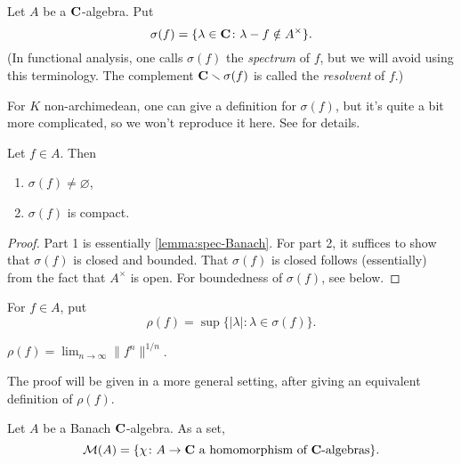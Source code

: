 \begin{definition}
Let $A$ be a $\mathbf{C}$-algebra. Put 
\[
  \sigma(f) = \{\lambda\in \mathbf{C}\colon \lambda-f\notin A^\times\} .
\]
(In functional analysis, one calls $\sigma(f)$ the \emph{spectrum} of $f$, but 
we will avoid using this terminology. The complement 
$\mathbf{C}\smallsetminus \sigma(f)$ is called the \emph{resolvent} of $f$.)
\end{definition}

For $K$ non-archimedean, one can give a definition for $\sigma(f)$, but it's 
quite a bit more complicated, so we won't reproduce it here. See 
\cite[Ch.~7]{berkovich-1990} for details. 

\begin{theorem}
Let $f\in A$. Then 
\begin{enumerate}
\item
$\sigma(f)\ne\varnothing$, 

\item
$\sigma(f)$ is compact. 
\end{enumerate}
\end{theorem}
\begin{proof}
Part 1 is essentially \autoref{lemma:spec-Banach}. For part 2, it suffices to 
show that $\sigma(f)$ is closed and bounded. That $\sigma(f)$ is closed follows 
(essentially) from the fact that $A^\times$ is open. For boundedness of 
$\sigma(f)$, see below. 
\end{proof}

\begin{definition}
For $f\in A$, put 
\[
  \rho(f) = \sup\{|\lambda|\colon \lambda\in \sigma(f)\} .
\]
\end{definition}

\begin{theorem}
$\rho(f) = \lim_{n\to \infty} \|f^n\|^{1/n}$. 
\end{theorem}
The proof will be given in a more general setting, after giving an equivalent 
definition of $\rho(f)$. 

\begin{definition}
Let $A$ be a Banach $\mathbf{C}$-algebra. As a set, 
\[
  \mathcal{M}(A) = \{\chi\colon A\to \mathbf{C}\text{ a homomorphism of $\mathbf{C}$-algebras}\} .
\]
\end{definition}

